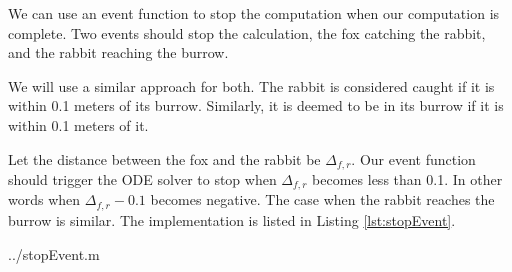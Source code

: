 We can use an event function to stop the computation when our computation is complete. Two events should stop the calculation, the fox catching the rabbit, and the rabbit reaching the burrow.

We will use a similar approach for both. The rabbit is considered caught if it is within 0.1 meters of its burrow. Similarly, it is deemed to be in its burrow if it is within 0.1 meters of it.

Let the distance between the fox and the rabbit be $\Delta_{f,r}$. Our event function should trigger the ODE solver to stop when $\Delta_{f,r}$ becomes less than 0.1. In other words when $\Delta_{f,r} - 0.1$ becomes negative. The case when the rabbit reaches the burrow is similar. The implementation is listed in Listing \ref{lst:stopEvent}.

  {../stopEvent.m}

